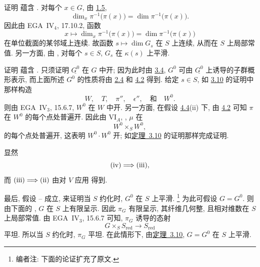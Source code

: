 证明 \textup{} 蕴含
\textup{}.
对每个 \(x\in G\), 由 \hyperref[lem:sga3-VIB-1.5]{1.5},
\[
  \dim_x\pi^{-1}\bigl(\pi(x)\bigr)
    =\dim\pi^{-1}\bigl(\pi(x)\bigr).
\]
因此由 EGA~IV\(_4\), 17.10.2, 函数
\[
  x\longmapsto
  \dim_x\pi^{-1}\bigl(\pi(x)\bigr)
    =\dim\pi^{-1}\bigl(\pi(x)\bigr)
\]
在单位截面的某邻域上连续.
故函数 \(s\mapsto\dim G_s\) 在 \(S\) 上连续,
从而在 \(S\) 上局部常值.
另一方面, 由 ,
对每个 \(s\in S\), \(G_s\) 在 \(\kappa(s)\) 上平滑.

证明 \textup{} 蕴含
\textup{}.
只须证明 \(\underline{G^0}\) 在 \(G\) 中开;
因为此时由 \hyperref[case:sga3-VIB-3.4]{3.4},
\(G^0\) 可由 \(\underline{G^0}\) 上诱导的子群概形表示,
而上面所述 \(G^0\) 的性质将由 \hyperref[cor:sga3-VIB-2.4]{2.4}
和 \hyperref[prop:sga3-VIB-4.2]{4.2} 得到.
给定 \(s\in S\), 如 \hyperref[thm:sga3-VIB-3.10]{3.10} 的证明中那样构造
\[
  W,\quad T,\quad \pi'',\quad \epsilon'',\quad\text{和}\quad W^0.
\]
则由 EGA~IV\(_3\), 15.6.7, \(W^0\) 在 \(W\) 中开.
另一方面, 在假设 \hyperref[cond:sga3-VIB-4.4-ii]{4.4}\textup{(ii)} 下,
由 \hyperref[prop:sga3-VIB-4.2]{4.2} 可知 \(\pi\) 在 \(W^0\) 的每个点处普遍开.
因此由 VI\(_A\), ,
\(\mu\) 在
\[
  W^0\times_S W^0,
\]
的每个点处普遍开, 这表明 \(W^0\cdot W^0\) 开;
如\hyperref[thm:sga3-VIB-3.10]{定理~3.10} 的证明那样完成证明.

显然
\[
  \textup{(iv)}\Longrightarrow\textup{(iii)},
\]
而 \(\textup{(iii)}\Longrightarrow\textup{(ii)}\)
由对 \(V\) 应用  得到.

最后, 假设 \textup{}--\textup{}
成立, 来证明当 \(S\) 约化时, \(G^0\) 在 \(S\) 上平滑.%
\footnote{\label{note:sga3-VIB-32}编者注: 下面的论证扩充了原文.}
为此可假设 \(G=G^0\). 则由下面的 ,
\(G\) 在 \(S\) 上有限呈示. 因此 \(\pi_G\) 有限呈示,
其纤维几何整, 且相对维数在 \(S\) 上局部常值.
由 EGA~IV\(_3\), 15.6.7 可知, \(\pi_G\) 诱导的态射
\[
  G\times_S S_{\mathrm{red}}\longrightarrow S_{\mathrm{red}}
\]
平坦. 所以当 \(S\) 约化时, \(\pi_G\) 平坦.
在此情形下, 由\hyperref[thm:sga3-VIB-3.10]{定理~3.10},
\(G=G^0\) 在 \(S\) 上平滑.

